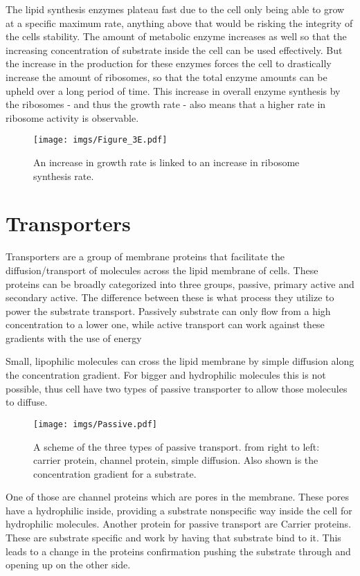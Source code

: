 The lipid synthesis enzymes plateau fast due to the cell only being able to grow at a specific maximum rate, anything above that would be risking the integrity of the cells stability. The amount of metabolic enzyme increases as well so that the increasing concentration of substrate inside the cell can be used effectively. But the increase in the production for these enzymes forces the cell to drastically increase the amount of ribosomes, so that the total enzyme amounts can be upheld over a long period of time. 
This increase in overall enzyme synthesis by the ribosomes - and thus the growth rate - also means that a higher rate in ribosome activity is observable.

\begin{figure}[H]
    \centering
    \texttt{[image: imgs/Figure\_3E.pdf]}
    \caption{An increase in growth rate is linked to an increase in ribosome synthesis rate.}
    \label{fig:Figure_3E}
\end{figure}

\section{Transporters}
Transporters are a group of membrane proteins that facilitate the diffusion/transport of molecules across the lipid membrane of cells. These proteins can be broadly categorized into three groups, passive, primary active and secondary active. The difference between these is what process they utilize to power the substrate transport. Passively substrate can only flow from a high concentration to a lower one, while active transport can work against these gradients with the use of energy

Small, lipophilic molecules can cross the lipid membrane by simple diffusion along the concentration gradient. For bigger and hydrophilic molecules this is not possible, thus cell have two types of passive transporter to allow those molecules to diffuse. 

\begin{figure}[H]
    \centering
    \texttt{[image: imgs/Passive.pdf]}
    \caption{A scheme of the three types of passive transport. from right to left: carrier protein, channel protein, simple diffusion. Also shown is the concentration gradient for a substrate.}
    \label{fig:Passive}
\end{figure}

One of those are channel proteins which are pores in the membrane. These pores have a hydrophilic inside, providing a substrate nonspecific way inside the cell for hydrophilic molecules. Another protein for passive transport are Carrier proteins. These are substrate specific and work by having that substrate bind to it. This leads to a change in the proteins confirmation pushing the substrate through and opening up on the other side.

